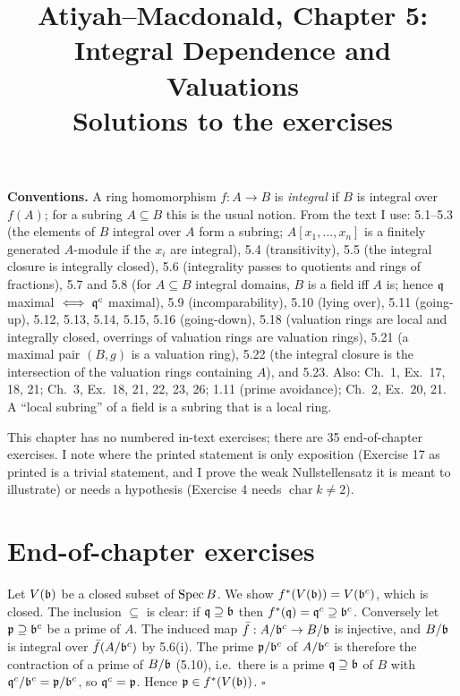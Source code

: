 \documentclass[11pt]{article}
\title{Atiyah--Macdonald, Chapter 5: Integral Dependence and Valuations\\[2pt]\large Solutions to the exercises}
\author{}
\date{}
\begin{document}
\maketitle
\noindent\textbf{Conventions.} A ring homomorphism $f:A\to B$ is \emph{integral} if $B$ is integral over $f(A)$; for a subring $A\subseteq B$ this is the usual notion. From the text I use: 5.1--5.3 (the elements of $B$ integral over $A$ form a subring; $A[x_1,\dots,x_n]$ is a finitely generated $A$-module if the $x_i$ are integral), 5.4 (transitivity), 5.5 (the integral closure is integrally closed), 5.6 (integrality passes to quotients and rings of fractions), 5.7 and 5.8 (for $A\subseteq B$ integral domains, $B$ is a field iff $A$ is; hence $\mathfrak q$ maximal $\iff\mathfrak q^c$ maximal), 5.9 (incomparability), 5.10 (lying over), 5.11 (going-up), 5.12, 5.13, 5.14, 5.15, 5.16 (going-down), 5.18 (valuation rings are local and integrally closed, overrings of valuation rings are valuation rings), 5.21 (a maximal pair $(B,g)$ is a valuation ring), 5.22 (the integral closure is the intersection of the valuation rings containing $A$), and 5.23. Also: Ch.~1, Ex.~17, 18, 21; Ch.~3, Ex.~18, 21, 22, 23, 26; 1.11 (prime avoidance); Ch.~2, Ex.~20, 21. A ``local subring'' of a field is a subring that is a local ring.

This chapter has no numbered in-text exercises; there are 35 end-of-chapter exercises. I note where the printed statement is only exposition (Exercise 17 as printed is a trivial statement, and I prove the weak Nullstellensatz it is meant to illustrate) or needs a hypothesis (Exercise 4 needs $\operatorname{char}k\ne2$).

\section*{End-of-chapter exercises}

\pf
Let $V(\mathfrak b)$ be a closed subset of $\operatorname{Spec} B$. We show $f^*(V(\mathfrak b))=V(\mathfrak b^c)$, which is closed. The inclusion $\subseteq$ is clear: if $\mathfrak q\supseteq\mathfrak b$ then $f^*(\mathfrak q)=\mathfrak q^c\supseteq\mathfrak b^c$. Conversely let $\mathfrak p\supseteq\mathfrak b^c$ be a prime of $A$. The induced map $\bar f:A/\mathfrak b^c\to B/\mathfrak b$ is injective, and $B/\mathfrak b$ is integral over $\bar f(A/\mathfrak b^c)$ by 5.6(i). The prime $\mathfrak p/\mathfrak b^c$ of $A/\mathfrak b^c$ is therefore the contraction of a prime of $B/\mathfrak b$ (5.10), i.e.\ there is a prime $\mathfrak q\supseteq\mathfrak b$ of $B$ with $\mathfrak q^c/\mathfrak b^c=\mathfrak p/\mathfrak b^c$, so $\mathfrak q^c=\mathfrak p$. Hence $\mathfrak p\in f^*(V(\mathfrak b))$. \hfill$\square$
\end{document}
